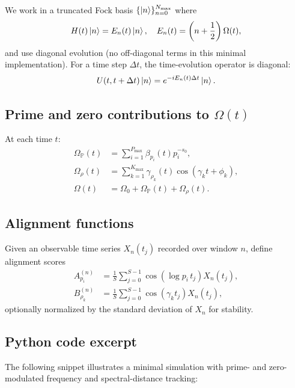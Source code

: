 \documentclass[11pt]{article}
\begin{document}
We work in a truncated Fock basis $\{\ket{n}\}_{n=0}^{N_{\max}}$ where
\[
H(t) \ket{n} = E_n(t) \ket{n}, \quad E_n(t) = \left( n + \frac{1}{2} \right)\Omega(t),
\]
and use diagonal evolution (no off-diagonal terms in this minimal implementation). For a time step $\Delta t$, the time-evolution operator is diagonal:
\[
U(t,t+\Delta t) \ket{n} = e^{-i E_n(t) \Delta t} \ket{n}.
\]

\subsection{Prime and zero contributions to $\Omega(t)$}

At each time $t$:
\begin{align*}
\Omega_{\mathbb{P}}(t) &= \sum_{i=1}^{P_{\max}} \beta_{p_i}(t) p_i^{-s_0}, \\
\Omega_{\rho}(t) &= \sum_{k=1}^{K_{\max}} \gamma_{\rho_k}(t) \cos(\gamma_k t + \phi_k), \\
\Omega(t) &= \Omega_0 + \Omega_{\mathbb{P}}(t) + \Omega_{\rho}(t).
\end{align*}

\subsection{Alignment functions}

Given an observable time series $X_n(t_j)$ recorded over window $n$, define alignment scores
\begin{align*}
A_{p_i}^{(n)} &= \frac{1}{S} \sum_{j=0}^{S-1} \cos(\log p_i \, t_j) X_n(t_j), \\
B_{\rho_k}^{(n)} &= \frac{1}{S} \sum_{j=0}^{S-1} \cos(\gamma_k t_j) X_n(t_j),
\end{align*}
optionally normalized by the standard deviation of $X_n$ for stability.

\subsection{Python code excerpt}

The following snippet illustrates a minimal simulation with prime- and zero-modulated frequency and spectral-distance tracking:
\end{document}
